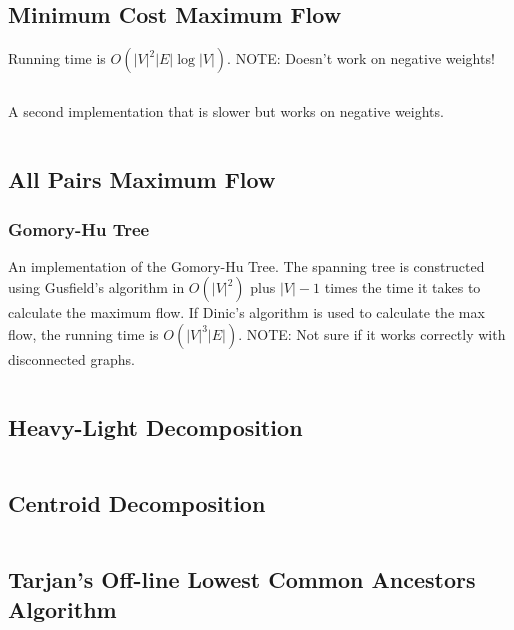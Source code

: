 \documentclass[9pt,a4paper,twocolumn,landscape,oneside]{amsart}
\newcommand{\code}[1]{\inputminted{cpp}{_code/#1}}
\newif\ifverbose
\begin{document}
    \subsection{Minimum Cost Maximum Flow}
        \ifverbose
        An implementation of Edmonds Karp's algorithm, modified to find
        shortest path to augment each time (instead of just any path). It
        computes the maximum flow of a flow network, and when there are
        multiple maximum flows, finds the maximum flow with minimum cost.
        \fi
        Running time is $O(|V|^2|E|\log|V|)$. NOTE: Doesn't work on negative
        weights!
        \code{graph/edmonds_karps_mcmf.cpp}

        A second implementation that is slower but works on negative weights.
        \code{graph/mcmf_old.cpp}

    \subsection{All Pairs Maximum Flow}
        \subsubsection{Gomory-Hu Tree}
        An implementation of the Gomory-Hu Tree. The spanning tree is constructed using Gusfield's algorithm
        in $O(|V| ^ 2)$ plus $|V|-1$ times the time it takes to calculate the maximum flow.
        If Dinic's algorithm is used to calculate the max flow, the running time is $O(|V|^3|E|)$.
        NOTE: Not sure if it works correctly with disconnected graphs.
        \code{graph/gomory_hu_tree.cpp}

    \subsection{Heavy-Light Decomposition}
        \code{graph/hld.cpp}

    \subsection{Centroid Decomposition}
        \code{graph/centroid_decomposition.cpp}

    \subsection{Tarjan's Off-line Lowest Common Ancestors Algorithm}
        \code{graph/tarjan_olca.cpp}
\end{document}
